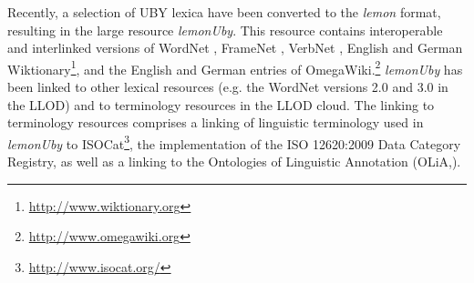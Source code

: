 Recently, a selection of UBY lexica have been converted to
the \emph{lemon} format, resulting in the large resource \emph{lemonUby}.
This resource
contains interoperable and interlinked versions of WordNet \cite{Fellbaum1998}, FrameNet \cite{baker1998berkley},
VerbNet \cite{kipper2008large}, English and German Wiktionary\footnote{\url{http://www.wiktionary.org}},
 and the English and German entries of
OmegaWiki.\footnote{\url{http://www.omegawiki.org}}
\emph{lemonUby} has been linked to other lexical resources (e.g. the WordNet versions 2.0 and 3.0 in the LLOD)
 and to terminology resources in the LLOD cloud.
The linking to terminology resources comprises a linking of linguistic terminology used in
\emph{lemonUby}  to 
ISOCat\footnote{\url{http://www.isocat.org/}}, the implementation of the ISO 12620:2009 Data Category Registry, as well as a linking to
the Ontologies of Linguistic Annotation (OLiA,\cite{chiarcos2008ontology,chiarcos2012ontologies}).

%
% 


